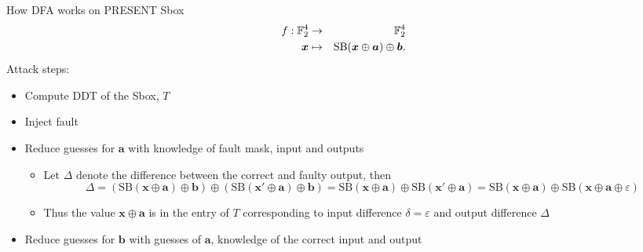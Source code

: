 \begin{frame}{How DFA works on PRESENT Sbox}
\begin{eqnarray*}
    f:{\mathbb F}_2^4&\to&{\mathbb F}_2^4\\
    \boldsymbol{x}&\mapsto& \text{SB}(\boldsymbol{x}\oplus\boldsymbol{a})\oplus\boldsymbol{b}.\nonumber
\end{eqnarray*}
 Attack steps:
\begin{itemize}
    \item Compute DDT of the Sbox, $T$
    \item Inject fault
    \item Reduce guesses for $\boldsymbol{a}$ with knowledge of fault mask, input and outputs
    \begin{itemize}
         \item Let $\Delta$ denote the difference between the correct and faulty output, then
\begin{equation*}
    \Delta=(\text{SB}(\boldsymbol{x}\oplus\boldsymbol{a})\oplus\boldsymbol{b})\oplus(\text{SB}(\boldsymbol{x}'\oplus\boldsymbol{a})\oplus\boldsymbol{b})
    =\text{SB}(\boldsymbol{x}\oplus\boldsymbol{a})\oplus\text{SB}(\boldsymbol{x}'\oplus\boldsymbol{a})=\text{SB}(\boldsymbol{x}\oplus\boldsymbol{a})\oplus\text{SB}(\boldsymbol{x}\oplus\boldsymbol{a}\oplus\varepsilon)
\end{equation*} 
\item Thus the value $\boldsymbol{x}\oplus\boldsymbol{a}$ is in the entry of $T$ corresponding to input difference $\delta=\varepsilon$ and output difference $\Delta$
    \end{itemize}
    \item Reduce guesses for $\boldsymbol{b}$ with guesses of $\boldsymbol{a}$, knowledge of the correct input and output
\end{itemize}
\end{frame}

